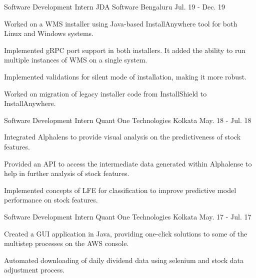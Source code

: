 

\begin{cventries}

  \cventry
    {Software Development Intern} %
    {JDA Software} %
    {Bengaluru} %
    {Jul. 19 - Dec. 19} %
    {
      \begin{cvitems}
        \item{Worked on a WMS installer using Java-based InstallAnywhere tool for both Linux
         and Windows systems.}
        \item{Implemented gRPC port support in both installers.
         It added the ability to run multiple instances of WMS on a single system.}
        \item{Implemented validations for silent mode of installation, making it more robust.}
        \item{Worked on migration of legacy installer code from InstallShield to InstallAnywhere.}
      \end{cvitems}
    }

  \cventry
    {Software Development Intern} %
    {Quant One Technologies} %
    {Kolkata} %
    {May. 18 - Jul. 18} %
    {
      \begin{cvitems}
        \item {Integrated Alphalens to provide visual analysis on the predictiveness
         of stock features.}
        \item {Provided an API to access the intermediate data generated within Alphalense
         to help in further analysis of stock features.}
        \item {Implemented concepts of LFE for classification to improve predictive
         model performance on stock features.}
      \end{cvitems}
    }

  \cventry
    {Software Development Intern} %
    {Quant One Technologies} %
    {Kolkata} %
    {May. 17 - Jul. 17} %
    {
      \begin{cvitems}
        \item {Created a GUI application in Java, providing one-click
         solutions to some of the multistep processes on the AWS console.}
        \item {Automated downloading of daily dividend data using selenium
         and stock data adjustment process.}
      \end{cvitems}
    }

\end{cventries}
